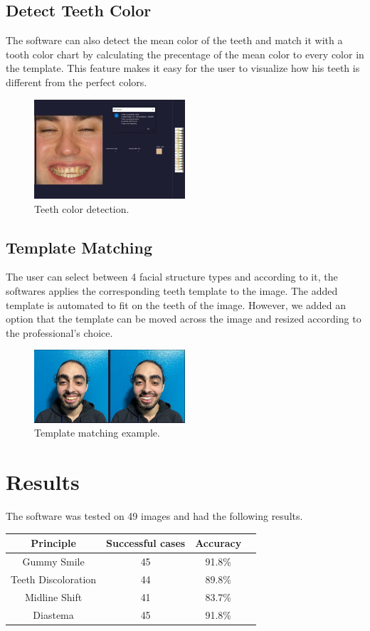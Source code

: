 \documentclass[conference,twocolumn]{IEEEtran}
\begin{document}
\subsection{Detect Teeth Color}
The software can also detect the mean color of the teeth and match it with a tooth color chart by calculating the precentage of the mean color to every color in the template. This feature makes it easy for the user to visualize how his teeth is different from the perfect colors. 
\begin{figure}[H]
    \centering
    \includegraphics[width=0.5\textwidth]{sahde.png}
    \caption{Teeth color detection.}
    \label{fig:my_label}
\end{figure}
\subsection{Template Matching} 
The user can select between 4 facial structure types and according to it, the softwares applies the corresponding teeth template to the image.
The added template is automated to fit on the teeth of the image. However, we added an option that the template can be moved across the image and resized according to the professional's choice. 
\begin{figure}[H]
    \centering
    \includegraphics[width=0.5\textwidth]{template.png}
    \caption{Template matching example.}
    \label{fig:my_label}
\end{figure}
\section{\textbf{Results}}

The software was tested on 49 images and had the following results.
\begin{center}
\begin{tabular}{||c c c c||} 
 \hline
 Principle & Successful cases & Accuracy \\ [0.5ex] 
 \hline\hline
 Gummy Smile & 45 & 91.8\% \\[1ex] 
 \hline
 Teeth Discoloration & 44 & 89.8\% \\[1ex] 
 \hline
 Midline Shift & 41 & 83.7\% \\[1ex] 
 \hline
 Diastema & 45 & 91.8\% \\ [1ex] 
\hline
\end{tabular}
\end{center}
\end{document}
